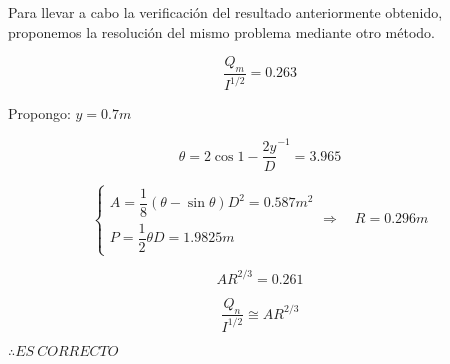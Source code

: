 Para llevar a cabo la verificación del resultado anteriormente obtenido, proponemos la resolución del mismo problema mediante otro método.

\begin{equation*}
  \dfrac{Q_{m}}{I^{1/2}} = 0.263
\end{equation*}

Propongo: $y = 0.7 m$

\begin{equation*}
  \theta = 2 \cos{1 - \dfrac{2 y}{D}}^{-1} = 3.965
\end{equation*}

\begin{equation*}
  \begin{cases}
    A = \dfrac{1}{8} (\theta - \sin{\theta}) D^{2} = 0.587 m^{2} \\
    P = \dfrac{1}{2} \theta D = 1.9825 m
  \end{cases}
  \Longrightarrow \quad
  R = 0.296 m
\end{equation*}

\begin{equation*}
  A R^{2/3} = 0.261
\end{equation*}

\begin{equation*}
  \dfrac{Q_{n}}{I^{1/2}} \cong A R^{2/3}
\end{equation*}

$\therefore ES\ CORRECTO$
